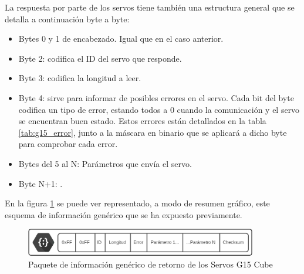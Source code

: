 	La respuesta por parte de los servos tiene también una estructura general que se detalla a continuación byte a byte:
	\begin{itemize}
		\item Bytes 0 y 1 de encabezado. Igual que en el caso anterior.
		\item Byte 2: codifica el ID del servo que responde.
		\item Byte 3: codifica la longitud a leer.
		\item Byte 4: sirve para informar de posibles errores en el servo. Cada bit del byte codifica un tipo de error, estando todos a 0 cuando la comunicación y el servo se encuentran buen estado. Estos errores están detallados en la tabla \ref{tab:g15_error}, junto a la máscara en binario que se aplicará a dicho byte para comprobar cada error.
		\item Bytes del 5 al N: Parámetros que envía el servo.
		\item Byte N+1: .
	\end{itemize}

	 En la figura \ref{fig:app:registrosg15:comunicacion_mensaje_from_servo} se puede ver representado, a modo de resumen gráfico, este esquema de información genérico que se ha expuesto previamente.

	 \begin{figure}[H]
	    	\centering
	    	\includegraphics[width=0.9\textwidth]{figuras/Imagenes_SW/Packet_From_G15.jpg}   
	    	\caption{Paquete de información genérico de retorno de los Servos G15 Cube}
	    	\label{fig:app:registrosg15:comunicacion_mensaje_from_servo}
	 \end{figure}

